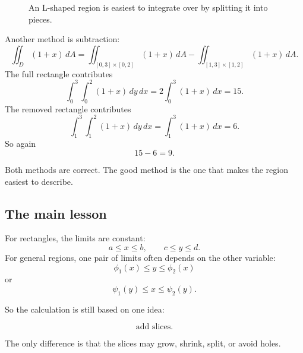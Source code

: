 \begin{figure}[h]
\centering
{}
\caption{An L-shaped region is easiest to integrate over by splitting it into pieces.}
\end{figure}

Another method is subtraction:
\[
\iint_D (1+x)\,dA
=
\iint_{[0,3]\times[0,2]}(1+x)\,dA
-
\iint_{[1,3]\times[1,2]}(1+x)\,dA.
\]
The full rectangle contributes
\[
    \int_0^3\int_0^2(1+x)\,dy\,dx
    =
    2\int_0^3(1+x)\,dx
    =
    15.
\]
The removed rectangle contributes
\[
    \int_1^3\int_1^2(1+x)\,dy\,dx
    =
    \int_1^3(1+x)\,dx
    =
    6.
\]
So again
\[
    15-6=9.
\]

Both methods are correct.  The good method is the one that makes the region easiest to
describe.

\subsection{The main lesson}

For rectangles, the limits are constant:
\[
    a\le x\le b,
    \qquad
    c\le y\le d.
\]
For general regions, one pair of limits often depends on the other variable:
\[
    \phi_1(x)\le y\le\phi_2(x)
\]
or
\[
    \psi_1(y)\le x\le\psi_2(y).
\]

So the calculation is still based on one idea:

\[
\boxed{
    \text{add slices.}
}
\]

The only difference is that the slices may grow, shrink, split, or avoid holes.

